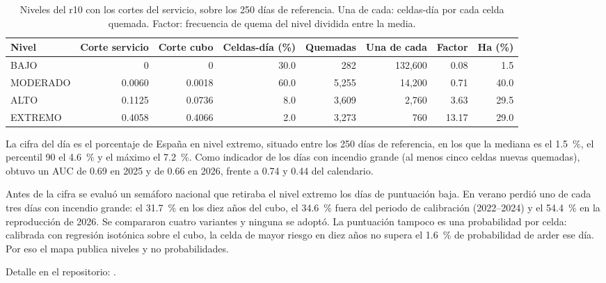 \documentclass[10pt,a4paper]{article}
\begin{document}
\begin{table}[H]
  \centering
  \caption{Niveles del r10 con los cortes del servicio, sobre los 250 días de
  referencia. Una de cada: celdas-día por cada celda quemada. Factor: frecuencia
  de quema del nivel dividida entre la media.}
  \label{tab:niveles}
  \footnotesize
  \begin{tabular}{@{}lrrrrrrr@{}}
    \toprule
    Nivel & Corte servicio & Corte cubo & Celdas-día (\%) & Quemadas & Una de cada & Factor & Ha (\%) \\
    \midrule
    BAJO     & 0      & 0      & 30.0 & 282   & 132,600 & 0.08  & 1.5  \\
    MODERADO & 0.0060 & 0.0018 & 60.0 & 5,255 & 14,200  & 0.71  & 40.0 \\
    ALTO     & 0.1125 & 0.0736 & 8.0  & 3,609 & 2,760   & 3.63  & 29.5 \\
    EXTREMO  & 0.4058 & 0.4066 & 2.0  & 3,273 & 760     & 13.17 & 29.0 \\
    \bottomrule
  \end{tabular}
\end{table}

La cifra del día es el porcentaje de España en nivel extremo, situado entre los
250 días de referencia, en los que la mediana es el 1.5~\%, el percentil 90 el
4.6~\% y el máximo el 7.2~\%. Como indicador de los días con incendio grande
(al menos cinco celdas nuevas quemadas), obtuvo un AUC de 0.69 en 2025 y de
0.66 en 2026, frente a 0.74 y 0.44 del calendario.

Antes de la cifra se evaluó un semáforo nacional que retiraba el nivel extremo
los días de puntuación baja. En verano perdió uno de cada tres días con
incendio grande: el 31.7~\% en los diez años del cubo, el 34.6~\% fuera del
periodo de calibración (2022--2024) y el 54.4~\% en la reproducción de 2026. Se
compararon cuatro variantes y ninguna se adoptó. La puntuación tampoco es una
probabilidad por celda: calibrada con regresión isotónica sobre el cubo, la
celda de mayor riesgo en diez años no supera el 1.6~\% de probabilidad de arder
ese día. Por eso el mapa publica niveles y no probabilidades.

Detalle en el repositorio:
.


\end{document}
